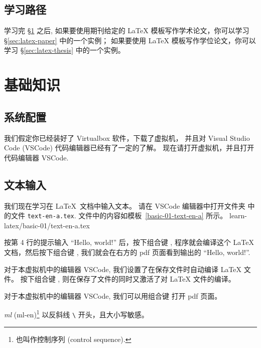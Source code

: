 \documentclass[
    11pt,
    base=hide,
    cite=authoryear,
    device=phone,
    lang=cn,
    mode=simple,
    result=answer,
    toc=onecol,
]{elegantbook_sierxue}
\begin{document}
\subsection*{学习路径}%
\label{sec:latex-learning}

学习完 \S\ref{sec:latex-basic} 之后,
如果要使用期刊给定的 \LaTeX{} 模板写作学术论文，你可以学习
\S\ref{sec:latex-paper} 中的一个实例；
如果要使用 \LaTeX{} 模板写作学位论文，你可以学习
\S\ref{sec:latex-thesis} 中的一个实例。

\section{基础知识}%
\label{sec:latex-basic}

\subsection*{系统配置}%
\label{sub:vm-vscode}

我们假定你已经装好了 Virtualbox 软件，下载了虚拟机，
并且对 Visual Studio Code (VSCode) 代码编辑器已经有了一定的了解。
现在请打开虚拟机，并且打开代码编辑器 VSCode.

\subsection{文本输入}%
\label{sub:latex-text}

我们现在学习在 \LaTeX\ 文档中输入文本。
请在 VSCode 编辑器中打开文件夹 
中的文件 \texttt{text-en-a.tex}.
文件中的内容如模板~\ref{basic-01-text-en-a} 所示。
%
{learn-latex/basic-01/text-en-a.tex}

按第 4 行的提示输入 ``Hello, world!'' 后，按下组合键 ,
程序就会编译这个 {\LaTeX} 文档，然后按下组合键 ,
我们就会在右方的 pdf 页面看到输出的 ``Hello, world!''.
\begin{tip}\label{tip:vscode-shortcut-compile}
    对于本虚拟机中的编辑器 VSCode,
    我们设置了在保存文件时自动编译 {\LaTeX} 文件。
    按下组合键 ,
    则在保存了文件的同时又激活了对 {\LaTeX} 文件的编译。
\end{tip}
\begin{tip}\label{tip:vscode-shortcut-pdfviewer}
    对于本虚拟机中的编辑器 VSCode,
    我们可以用组合键  打开 pdf 页面。
\end{tip}
\begin{latex}\label{tex:command}
    \emph{\gls{ml}} (\gls{ml-en})\footnote{
        也叫作控制序列 (control sequence).}
    以反斜线 \texttt{\textbackslash}
    开头，且大小写敏感。
\end{latex}
\end{document}
